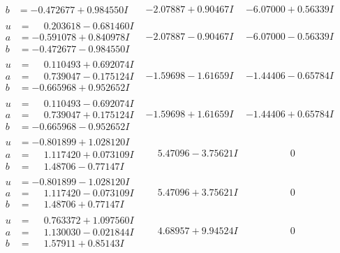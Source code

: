 \documentclass[1p]{elsarticle_modified}
\theoremstyle{definition}
\begin{document}
$$\begin{array}{c|c|c}
\begin{aligned}
b &= -0.472677 + 0.984550 I\end{aligned}
 & -2.07887 + 0.90467 I & -6.07000 + 0.56339 I \\ \hline\begin{aligned}
u &= \phantom{-}0.203618 - 0.681460 I \\
a &= -0.591078 + 0.840978 I \\
b &= -0.472677 - 0.984550 I\end{aligned}
 & -2.07887 - 0.90467 I & -6.07000 - 0.56339 I \\ \hline\begin{aligned}
u &= \phantom{-}0.110493 + 0.692074 I \\
a &= \phantom{-}0.739047 - 0.175124 I \\
b &= -0.665968 + 0.952652 I\end{aligned}
 & -1.59698 - 1.61659 I & -1.44406 - 0.65784 I \\ \hline\begin{aligned}
u &= \phantom{-}0.110493 - 0.692074 I \\
a &= \phantom{-}0.739047 + 0.175124 I \\
b &= -0.665968 - 0.952652 I\end{aligned}
 & -1.59698 + 1.61659 I & -1.44406 + 0.65784 I \\ \hline\begin{aligned}
u &= -0.801899 + 1.028120 I \\
a &= \phantom{-}1.117420 + 0.073109 I \\
b &= \phantom{-}1.48706 - 0.77147 I\end{aligned}
 & \phantom{-}5.47096 - 3.75621 I & \phantom{-0.000000 } 0 \\ \hline\begin{aligned}
u &= -0.801899 - 1.028120 I \\
a &= \phantom{-}1.117420 - 0.073109 I \\
b &= \phantom{-}1.48706 + 0.77147 I\end{aligned}
 & \phantom{-}5.47096 + 3.75621 I & \phantom{-0.000000 } 0 \\ \hline\begin{aligned}
u &= \phantom{-}0.763372 + 1.097560 I \\
a &= \phantom{-}1.130030 - 0.021844 I \\
b &= \phantom{-}1.57911 + 0.85143 I\end{aligned}
 & \phantom{-}4.68957 + 9.94524 I & \phantom{-0.000000 } 0 \\ \hline\begin{aligned}

\end{aligned}
\end{array}$$
\end{document}
